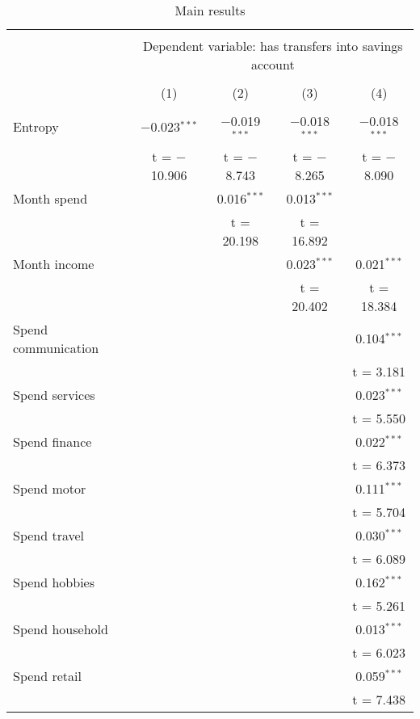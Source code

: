 
\begin{table}[!htbp] \centering 
  \caption{Main results} 
  \label{tab:main_results} 
\begin{tabular}{@{\extracolsep{5pt}}lcccc} 
\\[-1.8ex]\hline 
\hline \\[-1.8ex] 
 & \multicolumn{4}{c}{Dependent variable: has transfers into savings account} \\ 
\cline{2-5} 
\\[-1.8ex] & (1) & (2) & (3) & (4)\\ 
\hline \\[-1.8ex] 
 Entropy & $-$0.023$^{***}$ & $-$0.019$^{***}$ & $-$0.018$^{***}$ & $-$0.018$^{***}$ \\ 
  & t = $-$10.906 & t = $-$8.743 & t = $-$8.265 & t = $-$8.090 \\ 
  Month spend &  & 0.016$^{***}$ & 0.013$^{***}$ &  \\ 
  &  & t = 20.198 & t = 16.892 &  \\ 
  Month income &  &  & 0.023$^{***}$ & 0.021$^{***}$ \\ 
  &  &  & t = 20.402 & t = 18.384 \\ 
  Spend communication &  &  &  & 0.104$^{***}$ \\ 
  &  &  &  & t = 3.181 \\ 
  Spend services &  &  &  & 0.023$^{***}$ \\ 
  &  &  &  & t = 5.550 \\ 
  Spend finance &  &  &  & 0.022$^{***}$ \\ 
  &  &  &  & t = 6.373 \\ 
  Spend motor &  &  &  & 0.111$^{***}$ \\ 
  &  &  &  & t = 5.704 \\ 
  Spend travel &  &  &  & 0.030$^{***}$ \\ 
  &  &  &  & t = 6.089 \\ 
  Spend hobbies &  &  &  & 0.162$^{***}$ \\ 
  &  &  &  & t = 5.261 \\ 
  Spend household &  &  &  & 0.013$^{***}$ \\ 
  &  &  &  & t = 6.023 \\ 
  Spend retail &  &  &  & 0.059$^{***}$ \\ 
  &  &  &  & t = 7.438 \\ 

\end{tabular}
\end{table}
